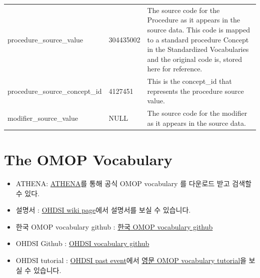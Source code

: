 \documentclass[]{book}
\providecommand{\tightlist}{%
  \setlength{\itemsep}{0pt}\setlength{\parskip}{0pt}}
\begin{document}
\begin{longtable}[]{@{}lll@{}}
\begin{minipage}[t]{0.30\columnwidth}
procedure\_source\_value\strut
\end{minipage} & \begin{minipage}[t]{0.14\columnwidth}\raggedright
304435002\strut
\end{minipage} & \begin{minipage}[t]{0.48\columnwidth}\raggedright
The source code for the Procedure as it appears in the source data. This code is mapped to a standard procedure Concept in the Standardized Vocabularies and the original code is, stored here for reference.\strut
\end{minipage}\tabularnewline
\begin{minipage}[t]{0.30\columnwidth}\raggedright
procedure\_source\_concept\_id\strut
\end{minipage} & \begin{minipage}[t]{0.14\columnwidth}\raggedright
4127451\strut
\end{minipage} & \begin{minipage}[t]{0.48\columnwidth}\raggedright
This is the concept\_id that represents the procedure source value.\strut
\end{minipage}\tabularnewline
\begin{minipage}[t]{0.30\columnwidth}\raggedright
modifier\_source\_value\strut
\end{minipage} & \begin{minipage}[t]{0.14\columnwidth}\raggedright
NULL\strut
\end{minipage} & \begin{minipage}[t]{0.48\columnwidth}\raggedright
The source code for the modifier as it appears in the source data.\strut
\end{minipage}\tabularnewline
\bottomrule
\end{longtable}

\hypertarget{omopVoca}{%
\chapter{The OMOP Vocabulary}\label{omopVoca}}

\begin{itemize}
\tightlist
\item
  ATHENA: \href{http://athena.ohdsi.org}{ATHENA}를 통해 공식 OMOP vocabulary 를 다운로드 받고 검색할 수 있다.
\item
  설명서 : \href{https://www.ohdsi.org/web/wiki/doku.php?id=documentation:vocabulary}{OHDSI wiki page}에서 설명서를 보실 수 있습니다.
\item
  한국 OMOP vocabulary github : \href{https://github.com/ohdsi-korea/OmopVocabularyKorea}{한국 OMOP vocabulary github}
\item
  OHDSI Github : \href{https://github.com/OHDSI/Vocabulary-v5.0}{OHDSI vocabulary github}
\item
  OHDSI tutorial : \href{https://www.ohdsi.org/past-events/}{OHDSI past event}에서 \href{https://www.ohdsi.org/past-events/2018-tutorials-omop-common-data-model-and-standardized-vocabularies/}{영문 OMOP vocabulary tutorial}을 보실 수 있습니다.
\end{itemize}
\end{document}
